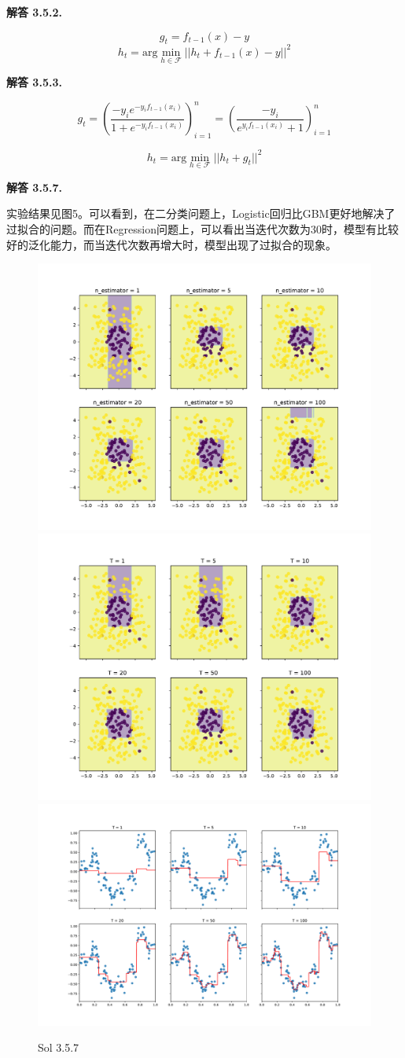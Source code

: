 \documentclass[12pt, a4paper, oneside]{ctexart}
\newenvironment{solution}[1]{\par\noindent\textbf{解答 #1. }\par}{\par}
\begin{document}
\begin{solution}{3.5.2}
    $$
        g_t=f_{t-1}(x)-y
    $$
    $$
        h_t=\text{arg}\min_{h\in\mathcal{F}}||h_t+f_{t-1}(x)-y||^2
    $$
\end{solution}

\begin{solution}{3.5.3}
    $$
        g_t=\left(\frac{-y_i e^{-y_i f_{t-1}(x_i)}}{1+e^{-y_i f_{t-1}(x_i)}}\right)_{i=1}^n=\left(\frac{-y_i}{e^{y_i f_{t-1}(x_i)}+1}\right)_{i=1}^n
    $$

    $$
        h_t=\text{arg}\min_{h\in\mathcal{F}}||h_t+g_t||^2
    $$
\end{solution}

\begin{solution}{3.5.7}
    实验结果见图5。可以看到，在二分类问题上，Logistic回归比GBM更好地解决了过拟合的问题。而在Regression问题上，可以看出当迭代次数为30时，模型有比较好的泛化能力，而当迭代次数再增大时，模型出现了过拟合的现象。
    \begin{figure}[htbp]
        \centering
        \includegraphics[width=.6\textwidth]{pdf/GBM_l2.pdf}
        \includegraphics[width=.6\textwidth]{pdf/GBM_logistic.pdf}
        \includegraphics[width=.6\textwidth]{pdf/GBM_regression.pdf}
        \caption{Sol 3.5.7}
    \end{figure}
    
\end{solution}
\end{document}
